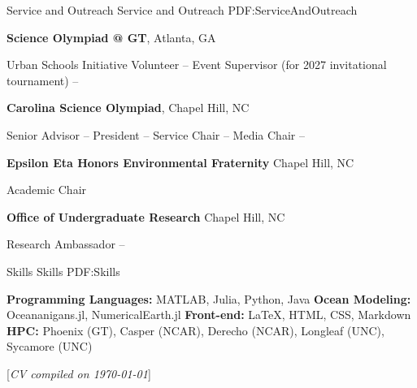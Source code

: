 \documentclass[letterpaper,MMMyyyy,nonstopmode]{simpleresumecv}
\newcommand{\CVNote}{CV compiled on {\today}}
\begin{document}
\begin{Body}





\Section
{Service and Outreach}
{Service and Outreach}
{PDF:ServiceAndOutreach}

\Entry
{\textbf{Science Olympiad @ GT}},
Atlanta, GA

\Gap
Urban Schools Initiative Volunteer
\hfill
{} --
\Gap
Event Supervisor (for 2027 invitational tournament)
\hfill
{} --

\Entry
{\textbf{Carolina Science Olympiad}},
Chapel Hill, NC

\Gap
Senior Advisor
\hfill
{} --
\Gap
President
\hfill
{} --
\Gap
Service Chair
\hfill
{} --
\Gap
Media Chair
\hfill
{} --

\Entry
{\textbf{Epsilon Eta Honors Environmental Fraternity}}
Chapel Hill, NC

\Gap
Academic Chair
\hfill
{}

\Entry
{\textbf{Office of Undergraduate Research}}
Chapel Hill, NC

\Gap
Research Ambassador
\hfill
{} --




\Section
{Skills}
{Skills}
{PDF:Skills}

\Entry
\textbf{Programming Languages:}
MATLAB, Julia, Python, Java
\Gap
\textbf{Ocean Modeling:}
Oceananigans.jl, NumericalEarth.jl
\Gap
\textbf{Front-end:}
\LaTeX, HTML, CSS, Markdown
\Gap
\textbf{HPC:}
Phoenix (GT), Casper (NCAR), Derecho (NCAR), Longleaf (UNC), Sycamore (UNC)







\end{Body}


\UseNoteFont%
\null\hfill%
[\textit{\CVNote}]
\end{document}
